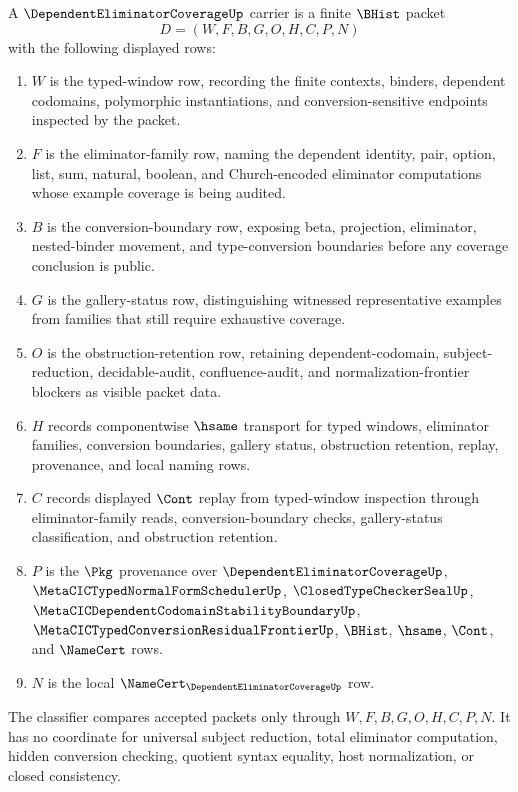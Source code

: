\begin{definition}\label{def:dependent-eliminator-coverage-carrier}
A $\DependentEliminatorCoverageUp$ carrier is a finite $\BHist$ packet
$$
D=(W,F,B,G,O,H,C,P,N)
$$
with the following displayed rows:
\begin{enumerate}
\item $W$ is the typed-window row, recording the finite contexts, binders, dependent codomains, polymorphic instantiations, and conversion-sensitive endpoints inspected by the packet.
\item $F$ is the eliminator-family row, naming the dependent identity, pair, option, list, sum, natural, boolean, and Church-encoded eliminator computations whose example coverage is being audited.
\item $B$ is the conversion-boundary row, exposing beta, projection, eliminator, nested-binder movement, and type-conversion boundaries before any coverage conclusion is public.
\item $G$ is the gallery-status row, distinguishing witnessed representative examples from families that still require exhaustive coverage.
\item $O$ is the obstruction-retention row, retaining dependent-codomain, subject-reduction, decidable-audit, confluence-audit, and normalization-frontier blockers as visible packet data.
\item $H$ records componentwise $\hsame$ transport for typed windows, eliminator families, conversion boundaries, gallery status, obstruction retention, replay, provenance, and local naming rows.
\item $C$ records displayed $\Cont$ replay from typed-window inspection through eliminator-family reads, conversion-boundary checks, gallery-status classification, and obstruction retention.
\item $P$ is the $\Pkg$ provenance over $\DependentEliminatorCoverageUp$, $\MetaCICTypedNormalFormSchedulerUp$, $\ClosedTypeCheckerSealUp$, $\MetaCICDependentCodomainStabilityBoundaryUp$, $\MetaCICTypedConversionResidualFrontierUp$, $\BHist$, $\hsame$, $\Cont$, and $\NameCert$ rows.
\item $N$ is the local $\NameCert_{\DependentEliminatorCoverageUp}$ row.
\end{enumerate}
The classifier compares accepted packets only through $W,F,B,G,O,H,C,P,N$. It has no coordinate for universal subject reduction, total eliminator computation, hidden conversion checking, quotient syntax equality, host normalization, or closed consistency.
\end{definition}

